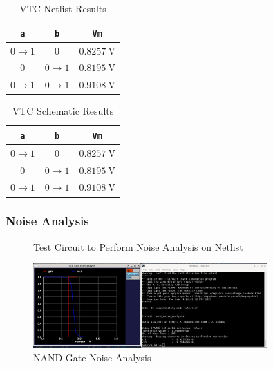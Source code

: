 \documentclass{article}
\begin{document}
	\begin{table}[H]
	\begin{center}
	\caption{VTC Netlist Results}
	\label{table::vtc_netlist}
	\begin{tabular}{| c | c | c |}
		\hline
		\texttt{a} & \texttt{b} & \texttt{Vm}\\
		\hline	
		$0 \rightarrow 1$ & $0$ & $0.8257\ \text{V}$\\
		\hline	
		$0$ & $0 \rightarrow 1$ & $0.8195\ \text{V}$\\
		\hline	
		$0 \rightarrow 1$ & $0 \rightarrow 1$ & $0.9108\ \text{V}$\\
		\hline
	\end{tabular}
	\end{center}
	\end{table}
	
	\begin{table}[H]
	\begin{center}
	\caption{VTC Schematic Results}
	\label{table::vtc_schematic}
	\begin{tabular}{| c | c | c |}
		\hline
		\texttt{a} & \texttt{b} & \texttt{Vm}\\
		\hline	
		$0 \rightarrow 1$ & $0$ & $0.8257\ \text{V}$\\
		\hline	
		$0$ & $0 \rightarrow 1$ & $0.8195\ \text{V}$\\
		\hline	
		$0 \rightarrow 1$ & $0 \rightarrow 1$ & $0.9108\ \text{V}$\\
		\hline
	\end{tabular}
	\end{center}
	\end{table}
	
	\subsubsection{Noise Analysis}
	\begin{figure}[H]
		
		\caption{Test Circuit to Perform Noise Analysis on Netlist}
		\label{fig::nand_noise_analysis_test_circuit}
	\end{figure}
	
	\begin{figure}[H]
		\centerline{\includegraphics[width=0.8\textwidth]{nand_noise_analysis.png}}
		\caption{NAND Gate Noise Analysis}
		\label{fig::nand_noise_analysis}
	\end{figure}
	
\end{document}
